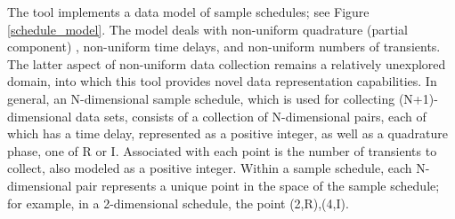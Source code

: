 The tool implements a data model of sample schedules; see 
Figure \ref{schedule_model}.  The model deals with non-uniform quadrature
(partial component) \cite{maciejewski2011random}, non-uniform time delays, 
and non-uniform numbers of transients.  The latter aspect of
non-uniform data collection remains a relatively unexplored domain, into
which this tool provides novel data representation capabilities.  In general,
an N-dimensional sample schedule, which is used for collecting (N+1)-dimensional
data sets, consists of a collection of N-dimensional pairs, each of which
has a time delay, represented as a positive integer, as well as a quadrature
phase, one of R or I.  Associated with each point is the number of transients
to collect, also modeled as a positive integer.  Within a sample schedule,
each N-dimensional pair represents a unique point in the space of the sample
schedule; for example, in a 2-dimensional schedule, the point (2,R),(4,I). 


